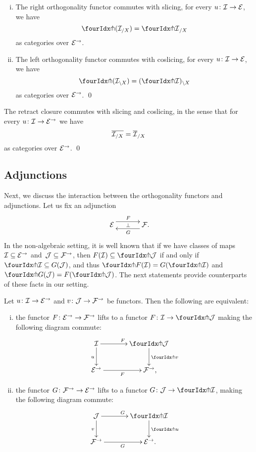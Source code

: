 \documentclass[reqno,10pt,a4paper,oneside,draft]{amsart}
\begin{document}
\begin{proposition} \label{pitchfork-slicing}
\leavevmode
\begin{enumerate}[(i)]
\item The right orthogonality functor commutes with slicing, \ie for every $u \co \cal{I} \to \catE$, we have
\[
  \liftr{(\cal{I}_{/X})} = {\liftr{\cal{I}}}_{/X}
\]
as categories over $\catE^\to$.
\item The left orthogonality functor commutes with coslicing, \ie for every $u \co \cal{I} \to \catE$, we have
\[
  \liftl{(\cal{I}_{\backslash X})} = (\liftl{\cal{I}})_{\backslash X}
\]
as categories over $\catE^\to$.
\qed
\end{enumerate}
\end{proposition}

\begin{proposition}
The retract closure commutes with slicing and coslicing, in the sense that for every $u \co \cal{I} \to \catE^\to$ we have
\[
  \overline{\cal{I}_{/X}} = \overline{\cal{I}}_{/X}
\]
as categories over $\catE^\to$.
\qed
\end{proposition}

\subsection*{Adjunctions}

Next, we discuss the interaction between the orthogonality functors and adjunctions.
Let us fix an adjunction
\[
\xymatrix@C+1em{
  \catE
  \ar@<5pt>[r]^{F}
  \ar@{}[r]|{\bot}
&
  \cal{F}
  \ar@<5pt>[l]^{G}
\rlap{.}}
\]
In the non-algebraic setting, it is well known that if we have classes of maps $\cal{I} \subseteq \catE^\to$ and~$\cal{J} \subseteq \cal{F}^\to$, then $F(\cal{I}) \subseteq \liftl{\cal{J}}$ if and only if $\liftr{\cal{I}} \subseteq G(\cal{J})$, and thus $\liftr{F(\cal{I})} = G(\liftr{\cal{I}})$ and $\liftl{G(\cal{J})} = F(\liftl{\cal{J}})$.
The next statements provide counterparts of these facts in our setting.

\begin{proposition} \label{lift-of-adjunction}
Let $u \co \cal{I} \to \catE^\to$ and $v \co \cal{J} \to \cal{F}^\to$ be functors.
Then the following are equivalent:
\begin{enumerate}[(i)]
\item the functor $F \co \catE^\to \to \cal{F}^\to$ lifts to a functor $F \co \cal{I} \to \liftl{\cal{J}}$ making the following diagram commute:
\[
\xymatrix@C=1.2cm{
  \cal{I}
  \ar[r]^{F}
  \ar[d]_{u}
&
  \liftl{\cal{J}}
  \ar[d]^{\liftl{v}}
\\
  \catE^\to
  \ar[r]_-{F}
&
  \cal{F}^\to
\rlap{,}}
\]
\item the functor $G \co \cal{F}^\to \to \catE^\to$ lifts to a functor $G \co \cal{J} \to \liftr{\cal{I}}$, making the following diagram commute:
\[
\xymatrix@C=1.2cm{
  \cal{J}
    \ar[d]_{v}
\ar[r]^{G}
&
  \liftr{\cal{I}}
  \ar[d]^{\liftr{u}}
\\
  \cal{F}^\to
   \ar[r]_{G}
&
  \catE^\to
\rlap{.}}
\]
\end{enumerate}
\end{proposition}
\end{document}
